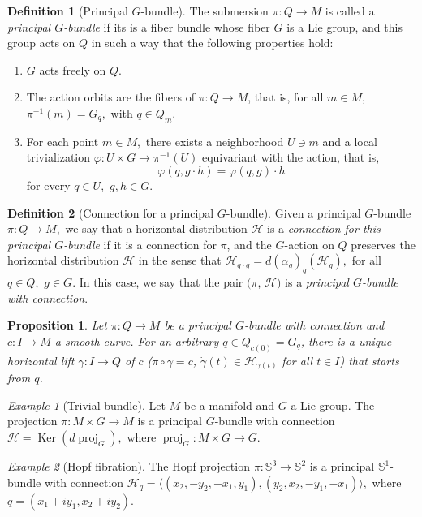 \documentclass [xcolor=svgnames, t] {beamer}
\theoremstyle{definition}
\newtheorem{df}{Definition}
\theoremstyle{plain}
\newtheorem{prop}{Proposition}
\theoremstyle{remark}
\newtheorem{ex}{Example}
\begin{document}
\begin{frame}
	\begin{df}[Principal $ G $-bundle]\label{df:principalGbundle}
	The submersion $ \pi: Q \rightarrow M$  is called a \textit{principal $ G $-bundle} if its is a fiber bundle whose fiber $ G $ is a Lie group, and this group acts on $ Q $ in such a way that the following properties hold:
	\begin{enumerate}
		\item $ G $ acts freely on $ Q $.
		\item The action orbits are the fibers of $ \pi:Q \rightarrow {M} $, that is, for all $ m\in M, $ $ \pi^{-1}(m) = G_q, $ with $ q\in Q_m. $ 
		\item For each point $ m\in M, $ there exists a neighborhood $ U\ni m $ and a local trivialization $ \varphi: U\times G \rightarrow \pi^{-1}(U)$ equivariant with the action, that is,
			$$ \varphi(q, g\cdot h)=\varphi(q,g)\cdot h  $$ 
			for every $ q\in U, $ $ g,h\in G. $ 
	\end{enumerate}
\end{df}
\begin{df}[Connection for a principal $ G $-bundle]
	Given a principal $ G $-bundle $ \pi: Q \rightarrow M, $ we say that a horizontal distribution $ \mathcal{H} $ is a \textit{connection for this principal $ G $-bundle} if it is a connection for $ \pi $, and the $ G $-action on $ Q $ preserves the horizontal distribution $ \mathcal{H} $ in the sense that $ \mathcal{H}_{q\cdot g} = d(\alpha_g)_q (\mathcal{H}_q), $ for all $ q\in Q, $ $ g\in G $. In this case, we say that the pair $ (\pi$, $ \mathcal{H}) $ is a \textit{principal $ G $-bundle with connection}. 

\end{df}
\begin{prop}
	Let $ \pi: Q \rightarrow M $ be a principal $ G $-bundle with connection and $ c: I \rightarrow M $ a smooth curve. For an arbitrary $ q\in Q_{c(0)}= G_q $, there is a unique horizontal lift $ \gamma: I \rightarrow Q $ of $ c $ ($\pi\circ\gamma =c$, $ \dot{\gamma}(t)\in \mathcal{H}_{\gamma(t)} $ for all $ t\in I $) that starts from $ q $.    	
\end{prop}
\begin{ex}[Trivial bundle]
	Let $ M $ be a manifold and $ G $ a Lie group. The projection $ \pi: M \times G \rightarrow M $ is a principal $ G $-bundle with connection $ \mathcal{H}= \operatorname{Ker}(  d \operatorname{proj}_G), $ 	where $ \operatorname{proj}_G : M\times G \rightarrow G. $ 
\end{ex}
\begin{ex}[Hopf fibration]
	The Hopf projection $ \pi: \mathbb{S}^3 \rightarrow \mathbb{S}^2 $ is a principal $ \mathbb{S}^1  $-bundle with connection $ \mathcal{H}_{q} = \langle(x_2,-y_2,-x_1,y_1),(y_2,x_2,-y_1,-x_1)\rangle,  $ where  	$ q=(x_1+iy_1, x_2+iy_2). $   
\end{ex}
\end{frame}
\end{document}
